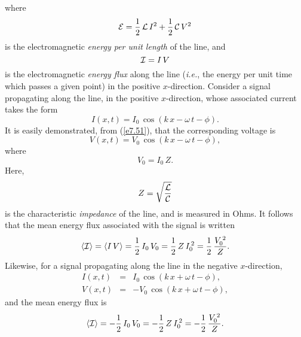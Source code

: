where
\begin{equation}
{\cal E} = \frac{1}{2}\,{\cal L}\,I^2 + \frac{1}{2}\,{\cal C}\,V^2
\end{equation}
is the electromagnetic {\em energy per unit length}\/ of the line, and
\begin{equation}
{\cal I} = I\,V
\end{equation}
is the electromagnetic {\em energy flux}\/ along the line  ({\em i.e.}, the energy per unit time which passes a given point) in the positive
$x$-direction.
Consider a signal propagating along the line, in the positive $x$-direction, whose associated current
takes the form
\begin{equation}
I(x,t) = I_0\,\cos(k\,x-\omega\,t-\phi).
\end{equation}
It is easily demonstrated, from (\ref{e7.51}), that the corresponding voltage is 
\begin{equation}
V(x,t) = V_0\,\cos(k\,x-\omega\,t-\phi),
\end{equation}
where
\begin{equation}
V_0 = I_0\,Z.
\end{equation}
Here,
\begin{equation}
Z = \sqrt{\frac{{\cal L}}{{\cal C}}}
\end{equation}
is the characteristic {\em impedance}\/ of the line, and is measured in Ohms. It follows that the mean energy flux associated
with the signal is written
\begin{equation}
\langle {\cal I}\rangle =\langle I\,V\rangle= \frac{1}{2}\,I_0\,V_0=  \frac{1}{2}\,Z\,I_0^{\,2} = \frac{1}{2}\,\frac{V_0^{\,2}}{Z}.
\end{equation}
Likewise, for a signal propagating along the line in the negative
$x$-direction,
\begin{eqnarray}
I(x,t) &= &I_0\,\cos(k\,x+\omega\,t-\phi),\\[0.5ex]
V(x,t) &=&-V_0\,\cos(k\,x+\omega\,t-\phi),
\end{eqnarray}
and
the mean energy flux is
\begin{equation}
\langle {\cal I}\rangle =-\frac{1}{2}\,I_0\,V_0=  -\frac{1}{2}\,Z\,I_0^{\,2} =- \frac{1}{2}\,\frac{V_0^{\,2}}{Z}.
\end{equation}

